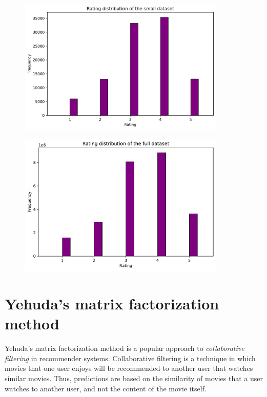 \documentclass{article}
\begin{document}
\begin{figure}[h!]
    \centering
    \begin{minipage}{.5\textwidth}
        \centering
        \captionsetup{justification=centering}
        \includegraphics[width=0.88\textwidth]{graphics/small_ratings_dist_1.pdf}
        \label{c3}
    \end{minipage}%
    \begin{minipage}{.5\textwidth}
        \centering
        \captionsetup{justification=centering}
        \includegraphics[width=0.88\textwidth]{graphics/full_ratings_dist_1.pdf}
        \label{c4}
    \end{minipage}
\end{figure}    

\newpage

\section{Yehuda's matrix factorization method}
Yehuda's matrix factorization method is a popular approach to \emph{collaborative filtering} in recommender systems.
Collaborative filtering is a technique in which movies that one user enjoys will be recommended to 
another user that watches similar movies. Thus, predictions are based on the similarity of movies that a user watches
to another user, and not the content of the movie itself.
\end{document}
